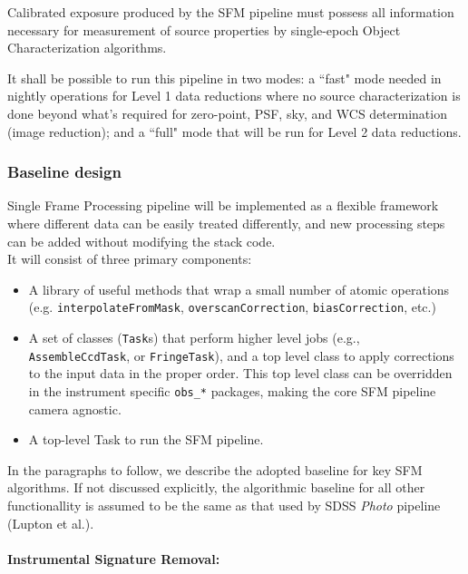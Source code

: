 \documentclass[12pt]{article}
\begin{document}
Calibrated exposure produced by the SFM pipeline must possess all information necessary for measurement of source properties by single-epoch Object Characterization algorithms.

It shall be possible to run this pipeline in two modes: a ``fast" mode needed in nightly operations for Level 1 data reductions where no source characterization is done beyond what's required for zero-point, PSF, sky, and WCS determination (image reduction); and a ``full" mode that will be run for Level 2 data reductions.

\subsubsection{Baseline design}

Single Frame Processing pipeline will be implemented as a flexible framework where different data can be easily treated differently, and new processing steps can be added without modifying the stack code.
\\

It will consist of three primary components:
%
\begin{itemize}
    \item A library of useful methods that wrap a small number of atomic operations (e.g. {\tt interpolateFromMask}, {\tt overscanCorrection}, {\tt biasCorrection}, etc.) %
    \item A set of classes ({\tt Task}s) that perform higher level jobs
    (e.g., {\tt AssembleCcdTask}, or {\tt FringeTask}), and a top level class to apply corrections to the input data in the proper order. This top level class can be overridden in the instrument specific {\tt obs\_*} packages, making the core SFM pipeline camera agnostic.
    \item A top-level Task to run the SFM pipeline.
\end{itemize}

In the paragraphs to follow, we describe the adopted baseline for key SFM algorithms. If not discussed explicitly, the algorithmic baseline for all other functionallity is assumed to be the same as that used by SDSS {\em Photo} pipeline (Lupton et al.).

\paragraph{Instrumental Signature Removal:}
\end{document}
